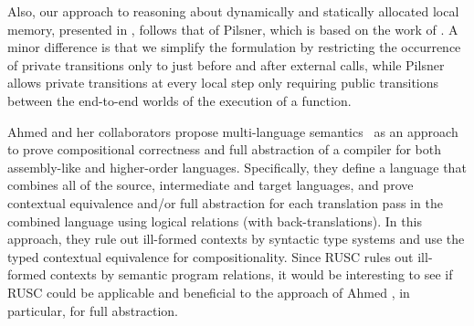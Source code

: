 Also, our approach to reasoning about dynamically and statically
allocated local memory, presented in ,
follows that of Pilsner, which is based on the work of
\cite{DBLP:conf/icfp/DreyerNB10}. A minor difference is that we
simplify the formulation by restricting the occurrence of private
transitions only to just before and after external calls, while
Pilsner allows private transitions at every local step only requiring
public transitions between the end-to-end worlds of the execution of a
function.








%
Ahmed and her collaborators propose multi-language
semantics~\cite{perconti:multilang,patterson:funtal,DBLP:conf/fossacs/SchererNRA18,New:2016,ICFP19}
as an approach to prove compositional correctness and full abstraction
of a compiler for both assembly-like and higher-order languages.
Specifically, they define a language that combines all of the source,
intermediate and target languages, and prove contextual equivalence
and/or full abstraction for each translation pass in the combined
language using logical relations (with back-translations).  In this
approach, they rule out ill-formed contexts by syntactic type systems
and use the typed contextual equivalence for compositionality.  Since RUSC
rules out ill-formed contexts by semantic program relations, it would
be interesting to see if RUSC could be applicable and beneficial to
the approach of Ahmed \etal, in particular, for full abstraction.

